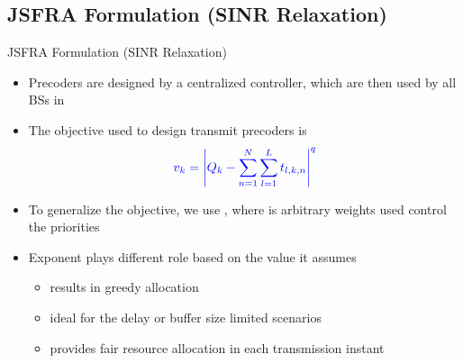 \documentclass[10pt]{beamer}
\begin{document}
\subsection{\acs{JSFRA} Formulation (\acs{SINR} Relaxation)}

\begin{frame}{\acs{JSFRA} Formulation (\acs{SINR} Relaxation)}
\begin{itemize}
\item Precoders are designed by a centralized controller, which are then used by all \acp{BS} in 
\item The objective used to design transmit precoders is 
\[ {\color{blue} v_k = \left | Q_k - \sum_{n = 1}^N \sum_{l = 1}^{L} t_{l,k,n} \right |^q } \]
\item To generalize the objective, we use , where  is arbitrary weights used control the priorities
\item Exponent  plays different role based on the value it assumes
	\begin{itemize}
	\item {} results in greedy allocation
	\item {} ideal for the delay or buffer size limited scenarios
	\item {} provides fair resource allocation in each transmission instant
	\end{itemize}
\end{itemize}
\end{frame}
\end{document}
